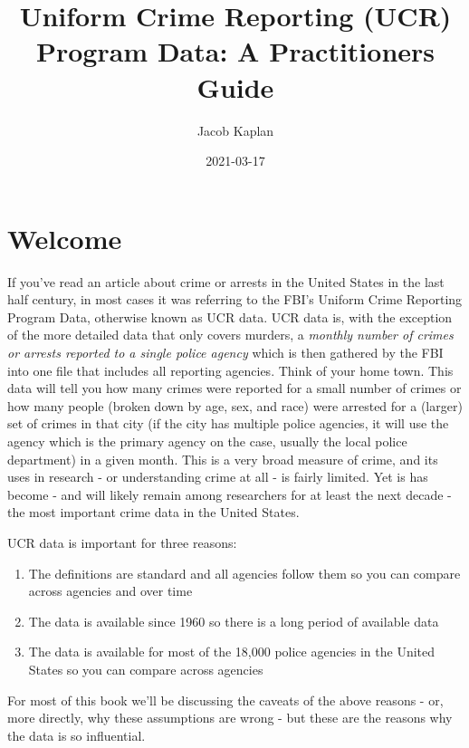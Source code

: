 \documentclass[
  12pt,
]{book}
\title{Uniform Crime Reporting (UCR) Program Data: A Practitioners Guide}
\author{Jacob Kaplan}
\date{2021-03-17}
\providecommand{\tightlist}{%
  \setlength{\itemsep}{0pt}\setlength{\parskip}{0pt}}
\begin{document}
\maketitle

{
\hypersetup{linkcolor=}
\setcounter{tocdepth}{1}
\tableofcontents
}
\hypertarget{welcome}{%
\chapter*{Welcome}\label{welcome}}

If you've read an article about crime or arrests in the United States in the last half century, in most cases it was referring to the FBI's Uniform Crime Reporting Program Data, otherwise known as UCR data. UCR data is, with the exception of the more detailed data that only covers murders, a \emph{monthly number of crimes or arrests reported to a single police agency} which is then gathered by the FBI into one file that includes all reporting agencies. Think of your home town. This data will tell you how many crimes were reported for a small number of crimes or how many people (broken down by age, sex, and race) were arrested for a (larger) set of crimes in that city (if the city has multiple police agencies, it will use the agency which is the primary agency on the case, usually the local police department) in a given month. This is a very broad measure of crime, and its uses in research - or understanding crime at all - is fairly limited. Yet is has become - and will likely remain among researchers for at least the next decade - the most important crime data in the United States.

UCR data is important for three reasons:

\begin{enumerate}
\def\labelenumi{\arabic{enumi}.}
\tightlist
\item
  The definitions are standard and all agencies follow them so you can compare across agencies and over time
\item
  The data is available since 1960 so there is a long period of available data
\item
  The data is available for most of the 18,000 police agencies in the United States so you can compare across agencies
\end{enumerate}

For most of this book we'll be discussing the caveats of the above reasons - or, more directly, why these assumptions are wrong - but these are the reasons why the data is so influential.
\end{document}
